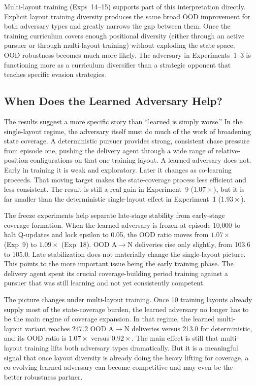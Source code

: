 \documentclass[sigconf]{aamas}
\begin{document}
Multi-layout training (Exps~14--15) supports part of this interpretation directly.
Explicit layout training diversity produces the same broad OOD improvement for both
adversary types and greatly narrows the gap between them.
Once the training curriculum covers enough positional diversity (either through an
active pursuer or through multi-layout training) without exploding the state
space, OOD robustness becomes much more likely. The adversary
in Experiments~1--3 is functioning more as a curriculum diversifier than a strategic
opponent that teaches specific evasion strategies.

\subsection{When Does the Learned Adversary Help?}

The results suggest a more specific story than ``learned is simply
worse.'' In the single-layout regime, the adversary itself must do much of the
work of broadening state coverage. A deterministic pursuer provides strong,
consistent chase pressure from episode one, pushing the delivery agent through a
wide range of relative-position configurations on that one training layout. A
learned adversary does not. Early in training it is weak and exploratory. Later
it changes as co-learning proceeds. That moving target makes the state-coverage
process less efficient and less consistent. The result is still a real gain in
Experiment~9 ($1.07\times$), but it is far smaller than the deterministic
single-layout effect in Experiment~1 ($1.93\times$).

The freeze experiments help separate late-stage stability from early-stage
coverage formation. When the learned adversary is frozen at episode 10{,}000 to
halt Q-updates and lock epsilon to 0.05, the OOD ratio moves from
$1.07\times$ (Exp~9) to $1.09\times$ (Exp~18). OOD A$\to$N deliveries rise
only slightly, from 103.6 to 105.0. Late stabilization does not materially change the
single-layout picture. This points
to the more important issue being the early training phase. The delivery agent
spent its crucial coverage-building period training against a pursuer that was
still learning and not yet consistently competent.

The picture changes under multi-layout training. Once 10 training layouts
already supply most of the state-coverage burden, the learned adversary no
longer has to be the main engine of coverage expansion. In that regime, the
learned multi-layout variant reaches 247.2 OOD A$\to$N deliveries versus 213.0
for deterministic, and its OOD ratio is $1.07\times$ versus $0.92\times$.
The main effect is still that
multi-layout training lifts both adversary types dramatically. But it is a
meaningful signal that once layout diversity is already doing the heavy lifting
for coverage, a co-evolving learned adversary can become competitive and may
even be the better robustness partner.
\end{document}
